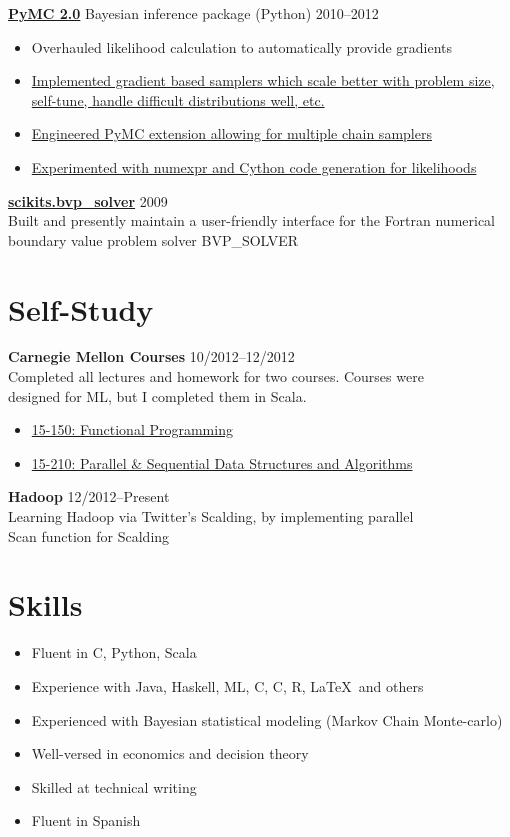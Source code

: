 \documentclass[margin]{res}
\newcommand{\bitem}{\begin{samepage}\begin{itemize} \itemsep -2pt}
\newcommand{\eitem}{\end{itemize}\end{samepage} }
\newcommand{\hrowbase}[3]{
  {\bf #1} #2 \hfill #3
}
\newcommand{\headrow}[3]{
  \hrowbase{#1}{#2}{#3}
    \vspace{6pt}
    \bitem
      }
\newcommand{\eheadrow}[0]{\eitem}
\newcommand{\headrowdesc}[3]{
  \hrowbase{#1}{}{#2} \ \\
    #3
    \vspace{6pt}
      }
\newcommand{\CPP}
{C\nolinebreak[4]\hspace{-.05em}\raisebox{.22ex}{\footnotesize\bf ++}}
\newcommand{\CS}
{C\nolinebreak[4]\hspace{-.05em}\raisebox{.22ex}{\footnotesize\#}}
\begin{document}
\begin{resume}
    \headrow{\href{https://github.com/pymc-devs/pymc\#readme}{PyMC 2.0}}{Bayesian inference package (Python)}{2010--2012}
      \item Overhauled likelihood calculation to automatically provide gradients 
      \item \href{https://github.com/jsalvatier/gradient\_samplers/blob/master/gradient\_samplers}{Implemented gradient based samplers which scale better with problem size, self-tune, handle difficult distributions well, etc.}
      \item \href{http://pypi.python.org/pypi/multichain\_mcmc}{Engineered PyMC extension allowing for multiple chain samplers}
      \item \href{https://github.com/pymc-devs/pymc/commits/numexpr\_dist}{Experimented with numexpr and Cython code generation for likelihoods}
    \eheadrow

    \headrowdesc{\href{packages.python.org/scikits.bvp\_solver}{scikits.bvp\_solver}}{2009}{
      Built and presently maintain a user-friendly interface for the Fortran numerical \\
    boundary value problem solver BVP\_SOLVER}

\section{Self-Study}
    \headrowdesc{Carnegie Mellon Courses}{10/2012--12/2012}{Completed all lectures and homework for two courses. Courses were \\
    designed for ML, but I completed them in Scala.} 
    \bitem
\item \href{http://www.cs.cmu.edu/~15150/previous-semesters/2012-spring/}{15-150: Functional Programming}
      \item \href{http://www.cs.cmu.edu/~15210/index.html}{15-210: Parallel \& Sequential Data Structures and Algorithms}
    \eitem
    \headrowdesc{Hadoop}{12/2012--Present}{Learning Hadoop via Twitter's Scalding, by implementing parallel \\
      Scan function for Scalding}

\section{Skills}
    \bitem
      \item Fluent in \CS, Python, Scala
      \item Experience with Java, Haskell, ML, C, \CPP, R, \LaTeX\ and others
      \item Experienced with Bayesian statistical modeling (Markov Chain Monte-carlo)
      \item Well-versed in economics and decision theory
      \item Skilled at technical writing
      \item Fluent in Spanish 
    \eitem


\end{resume}
\end{document}
